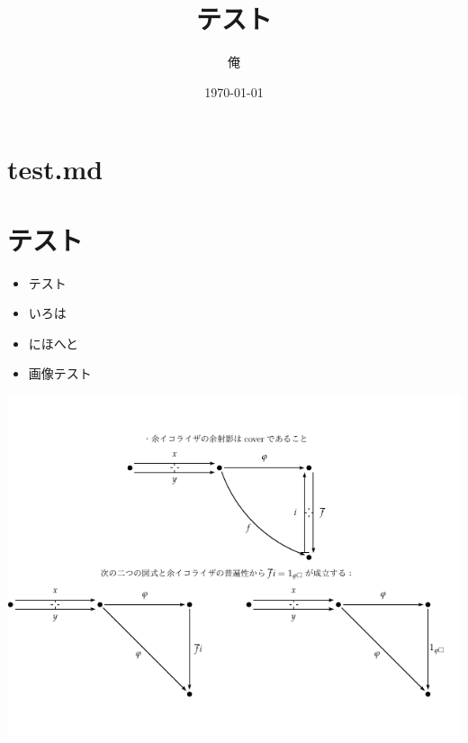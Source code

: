 \documentclass{ltjsarticle}
\date{\today}
\author{俺}
\title{テスト}
\begin{document}
\maketitle
\section{test.md}

\section{テスト}

\begin{itemize}
\item
  テスト
\item
  いろは
\item
  にほへと
\item
  画像テスト
\end{itemize}

\begin{center}
  \includegraphics{example.pdf}
\end{center}
\end{document}
